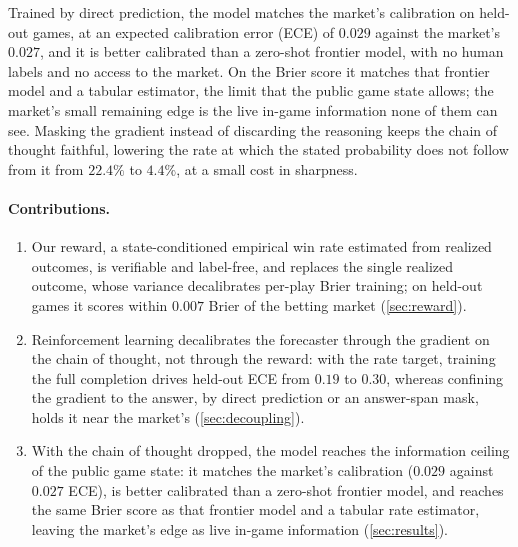 Trained by direct prediction, the model matches the market's calibration on held-out games, at an
expected calibration error (ECE) of $0.029$ against the market's $0.027$, and it is better calibrated
than a zero-shot frontier model, with no human labels and no access to the market. On the Brier score it
matches that frontier model and a tabular estimator, the limit that the public game state allows; the
market's small remaining edge is the live in-game information none of them can see. Masking
the gradient instead of discarding the reasoning keeps the chain of thought faithful, lowering the rate
at which the stated probability does not follow from it from $22.4\%$ to $4.4\%$, at a small cost in
sharpness.

\paragraph{Contributions.}
\begin{enumerate}[leftmargin=1.4em,itemsep=2pt,topsep=2pt]
\item Our reward, a state-conditioned empirical win rate estimated from realized outcomes, is verifiable
and label-free, and replaces the single realized outcome, whose variance decalibrates per-play Brier
training; on held-out games it scores within $0.007$ Brier of the betting market
(\cref{sec:reward}).
\item Reinforcement learning decalibrates the forecaster through the gradient on the chain of thought,
not through the reward: with the rate target, training the full completion drives held-out ECE
from $0.19$ to $0.30$, whereas confining the gradient to the answer, by direct prediction or an
answer-span mask, holds it near the market's (\cref{sec:decoupling}).
\item With the chain of thought dropped, the model reaches the information ceiling of the public game
state: it matches the market's calibration ($0.029$ against $0.027$ ECE), is better calibrated than a
zero-shot frontier model, and
reaches the same Brier score as that frontier model and a tabular rate estimator, leaving the market's
edge as live in-game information (\cref{sec:results}).
\end{enumerate}
